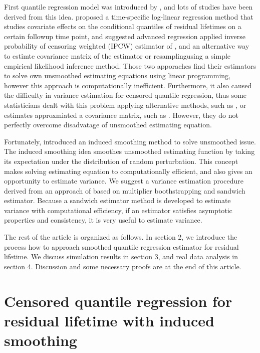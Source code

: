 \documentclass[titlepage,english,12pt]{article}
\begin{document}
	
	First quantile regression model was introduced by \citet{koenker1978regression}, and lots of studies have been derived from this idea.
	\citet{jung2009regression} proposed a time-specific log-linear regression method that studies covariate effects on the conditional quantiles of residual lifetimes on a certain followup time point,
	and \citet{kim2012censored} suggested advanced regression applied inverse probability of censoring weighted (IPCW) estimator of \citet{van2003unified}, and an alternative way to estimte covariance matrix of the estimator or resamplingusing a simple empirical likelihood inference method.
	Those two apporaches find their estimators to solve own unsmoothed estimating equations using linear programming, however this approach is computationally inefficient. 
	Furthermore, it also caused the difficulty in variance estimation for censored quantile regression, thus some statisticians dealt with this problem applying alternative methods, such as \citet{kim2012censored}, or estimates approxmiated a covariance matrix, such as \cite{jung2009regression}. 
	However, they do not perfectly overcome disadvatage of unsmoothed estimating equation.
	
	 
	Fortunately, \citet{brown2007induced} introduced an induced smoothing method to solve unsmoothed issue.
	The induced smoothing idea smoothes unsmoothed estimating function by taking its expectation under the distribution of random perturbation.
	This concept makes solving estimating equation to computationally efficient, and also gives an opportunity to estimate variance.
	We suggest a variance estimation procedure derived from an approach of \citet{chiou2015semiparametric} based on multiplier boothstrapping and sandwich estimator.
	Because a sandwich estimator method is developed to estimate variance with computational efficiency, if an estimator satisfies asymptotic properties and consistency, it is very useful to estimate variance.
	
	The rest of the article is organized as follows.
	In section 2, we introduce the process how to approach smoothed quantile regression estimator for residual lifetime. 
	We discuss simulation results in section 3, and real data analysis in section 4.
	Discussion and some necessary proofs are at the end of this article.\\
	
\section{Censored quantile regression for residual lifetime with induced smoothing}
\end{document}

